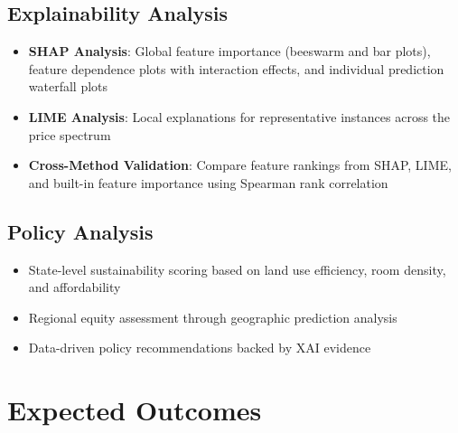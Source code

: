 \documentclass[12pt, a4paper]{article}
\begin{document}
\subsection{Explainability Analysis}

\begin{itemize}
    \item \textbf{SHAP Analysis}: Global feature importance (beeswarm and bar plots), feature dependence plots with interaction effects, and individual prediction waterfall plots
    \item \textbf{LIME Analysis}: Local explanations for representative instances across the price spectrum
    \item \textbf{Cross-Method Validation}: Compare feature rankings from SHAP, LIME, and built-in feature importance using Spearman rank correlation
\end{itemize}

\subsection{Policy Analysis}

\begin{itemize}
    \item State-level sustainability scoring based on land use efficiency, room density, and affordability
    \item Regional equity assessment through geographic prediction analysis
    \item Data-driven policy recommendations backed by XAI evidence
\end{itemize}

\section{Expected Outcomes}
\end{document}
